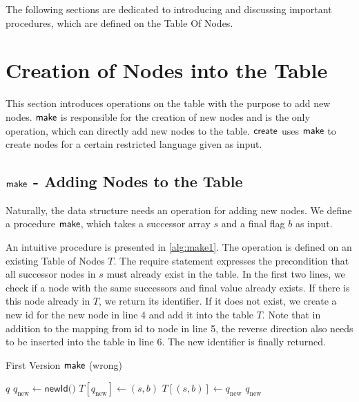 \par 

The following sections are dedicated to introducing and discussing important procedures, which are defined on the Table Of Nodes. 

\section{Creation of Nodes into the Table}
This section introduces operations on the table with the purpose to add new nodes. $\operatorname{\textsf{make}}$ is responsible for the creation of new nodes and is the only operation, which can directly add new nodes to the table. $\operatorname{\textsf{create}}$ uses $\operatorname{\textsf{make}}$ to create nodes for a certain restricted language given as input.

\subsection{$\operatorname{\textsf{make}}$ - Adding Nodes to the Table}
Naturally, the data structure needs an operation for adding new nodes. We define a procedure $\operatorname{\textsf{make}}$, which takes a successor array $s$ and a final flag $b$ as input. 

An intuitive procedure is presented in \autoref{alg:make1}.
The operation is defined on an existing Table of Nodes $T$.
The require statement expresses the precondition that all successor nodes in $s$ must already exist in the table. In the first two lines, we check if a node with the same successors and final value already exists. If there is this node already in $T$, we return its identifier. If it does not exist, we create a new id for the new node in line 4 and add it into the table $T$. Note that in addition to the mapping from id to node in line 5, the reverse direction also needs to be inserted into the table in line 6. The new identifier is finally returned.

\begin{algorithm}
\caption{First Version $\operatorname{\textsf{make}}$ (wrong)}\label{alg:make1}
\begin{algorithmic}[1]
\Return $q$
\Else
\State $q_{\text{new}} \gets \textsf{newId()}$
\State $T[q_{\text{new}}] \gets (s,b)$
\State $T[(s,b)] \gets q_{\text{new}}$
\Return $q_{\text{new}}$
\EndIf
\end{algorithmic}
\end{algorithm}

